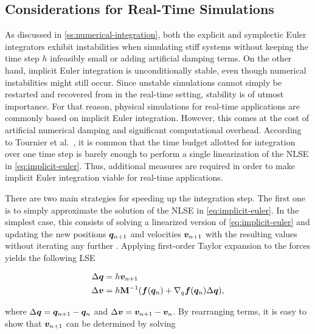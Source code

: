 \subsection{Considerations for Real-Time Simulations}\label{ss:numerical-integration-rt}
As discussed in \cref{ss:numerical-integration}, both the explicit and symplectic Euler integrators exhibit instabilities when simulating
stiff systems without keeping the time step $h$ infeasibly small or adding artificial damping terms. On the other hand, implicit Euler integration
is unconditionally stable, even though numerical instabilities might still occur. Since unstable simulations cannot simply be restarted and 
recovered from in the real-time setting, stability is of utmost importance. For that reason, physical simulations for real-time applications
are commonly based on implicit Euler integration. However, this comes at the cost of artificial numerical damping and significant computational
overhead. According to Tournier et al.\ \cite{tournier2015}, it is common that the time budget allotted for integration over one time step is 
barely enough to perform a single linearization of the NLSE in \cref{eq:implicit-euler}. Thus, additional measures are required in order to make
implicit Euler integration viable for real-time applications. 

There are two main strategies for speeding up the integration step. The first one is to simply approximate the solution of the NLSE in
\autoref{eq:implicit-euler}. In the simplest case, this consists of solving a linearized version of \autoref{eq:implicit-euler} and updating 
the new positions $\bm{q}_{n+1}$ and velocities $\bm{v}_{n+1}$ with the resulting values without iterating any further \cite{baraff1998}. 
Applying first-order Taylor expansion to the forces yields the following LSE

\begin{equation}\label{eq:linear-implicit-lse}
    \begin{split}
    \Delta \bm{q} &= h \bm{v}_{n+1} \\
    \Delta \bm{v} &= h \mathbf{M}^{-1}(\bm{f}(\bm{q}_n) + \nabla_q \bm{f}(\bm{q}_n) \Delta \bm{q}),
    \end{split}
\end{equation}

\noindent where $\Delta \bm{q} = \bm{q}_{n+1} - \bm{q}_n$ and $\Delta \bm{v} = \bm{v}_{n+1} - \bm{v}_n$. By rearranging terms, it is 
easy to show that $\bm{v}_{n+1}$ can be determined by solving

